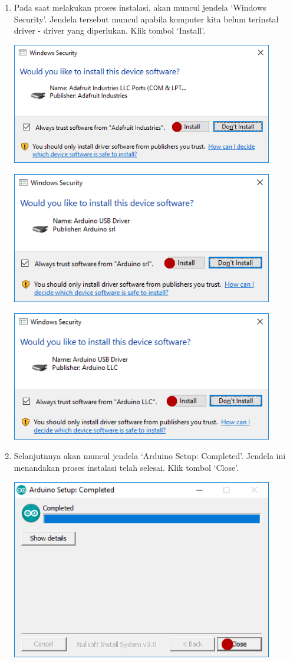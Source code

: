 \begin{enumerate}
\item Pada saat melakukan proses instalasi, akan muncul jendela `Windows Security'. Jendela tersebut muncul apabila komputer kita belum terinstal driver - driver yang diperlukan. Klik tombol `Install'.
\break
\centerline{\includegraphics[width=0.9\textwidth]{figures/aride5.png}}
\break
\centerline{\includegraphics[width=0.9\textwidth]{figures/aride6.png}}
\break
\centerline{\includegraphics[width=0.9\textwidth]{figures/aride7.png}}
\item Selanjutnnya akan muncul jendela `Arduino Setup: Completed'. Jendela ini menandakan proses instalasi telah selesai. Klik tombol `Close'.
\break
\centerline{\includegraphics[width=0.9\textwidth]{figures/aride10.png}}

\end{enumerate}
